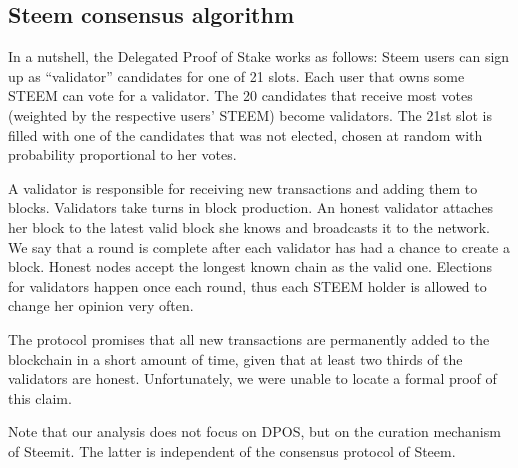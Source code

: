 


  \subsection{Steem consensus algorithm}
    In a nutshell, the Delegated Proof of Stake
    \cite{steemdpos,bitsharesdpos,steem} works as follows: Steem users can sign
    up as ``validator'' candidates for one of 21 slots. Each user that owns some
    STEEM can vote for a validator. The 20 candidates that receive most votes
    (weighted by the respective users' STEEM) become validators. The 21st slot
    is filled with one of the candidates that was not elected, chosen at random
    with probability proportional to her votes.

    A validator is responsible for receiving new transactions and adding them to
    blocks. Validators take turns in block production. An honest validator
    attaches her block to the latest valid block she knows and broadcasts it to
    the network. We say that a round is complete after each validator has had a
    chance to create a block. Honest nodes accept the longest known chain as the
    valid one. Elections for validators happen once each round, thus each STEEM
    holder is allowed to change her opinion very often.

    The protocol promises that all new transactions are permanently added to the
    blockchain in a short amount of time, given that at least two thirds of the
    validators are honest. Unfortunately, we were unable to locate a formal
    proof of this claim.

    Note that our analysis does not focus on DPOS, but on the curation mechanism
    of Steemit. The latter is independent of the consensus protocol of Steem.
